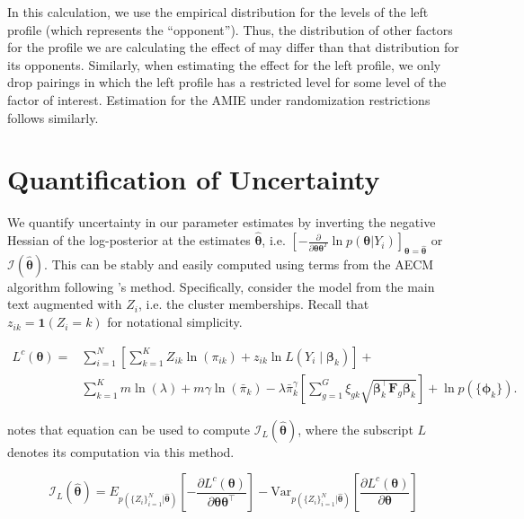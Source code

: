 In this calculation, we use the empirical distribution for the levels
of the left profile (which represents the ``opponent'').  Thus, the
distribution of other factors for the profile we are calculating the
effect of may differ than that distribution for its opponents.
Similarly, when estimating the effect for the left profile, we only
drop pairings in which the left profile has a restricted level for
some level of the factor of interest.  Estimation for the AMIE under
randomization restrictions follows similarly.



\section{Quantification of Uncertainty}
\label{sec:app_uncertainty}

We quantify uncertainty in our parameter estimates by inverting the negative Hessian of the log-posterior at the estimates $\hat{\bm{\theta}}$, i.e. $\left[-\frac{\partial}{\partial \bm{\theta}\bm{\theta}^T} \ln p(\bm{\theta} | Y_i)\right]_{\bm{\theta} = \hat{\bm{\theta}}}$ or $\mathcal{I}(\hat{\bm{\theta}})$. This can be stably and easily computed using terms from the AECM algorithm following \cite{loui:82}'s method. Specifically, consider the model from the main text augmented with $Z_i$, i.e. the cluster memberships. Recall that $z_{ik} = \mathbf{1}(Z_i = k)$ for notational simplicity.

\begin{equation}
\begin{aligned}
L^c(\bm{\theta}) = &\sum_{i=1}^N \left[\sum_{k=1}^K Z_{ik}
\ln(\pi_{ik}) + z_{ik} \ln L(Y_i \mid \bm{\beta}_k)\right] + \\
&\sum_{k=1}^K m \ln(\lambda) + m \gamma \ln(\bar{\pi}_k) - \lambda
\bar{\pi}^\gamma_k \left[\sum_{g=1}^G \xi_{gk} \sqrt{\bm{\beta}^\top_k
	\bm{F}_{g} \bm{\beta}_k}\right] + \ln p(\{\bm{\phi}_k\}).
\end{aligned}
\end{equation}

\cite{loui:82} notes that equation can be used to compute $\mathcal{I}_L(\hat{\bm{\theta}})$, where the subscript $L$ denotes its computation via this method.

\begin{equation}
\mathcal{I}_{L}(\hat{\bm{\theta}}) = E_{p\left(\{Z_i\}_{i=1}^N|\hat{\bm{\theta}}\right)}\left[-\frac{\partial L^c(\bm{\theta})}{\partial \bm{\theta}\bm{\theta}^\top}\right] - \mathrm{Var}_{p\left(\{Z_i\}_{i=1}^N | \hat{\bm{\theta}}\right)}\left[\frac{\partial L^c(\bm{\theta})}{\partial \bm{\theta}}\right]
\end{equation}

